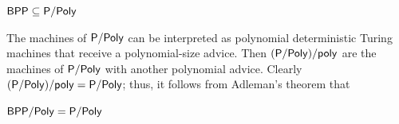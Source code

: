 \begin{theorem}\label{adleman}
    $\mathsf{BPP} \subseteq \mathsf{P/Poly}$
\end{theorem}

The machines of $\mathsf{P/Poly}$ can be interpreted as polynomial deterministic Turing machines that receive a polynomial-size advice.
Then $(\mathsf{P/Poly})/\mathsf{poly}$ are the machines of $\mathsf{P/Poly}$ with another polynomial advice.
Clearly $(\mathsf{P/Poly})/\mathsf{poly} = \mathsf{P/Poly}$; thus, it follows from Adleman's theorem that

\begin{corollary}\label{coro:bpppoly-equals-ppoly}
    $\mathsf{BPP/Poly} = \mathsf{P/Poly}$
\end{corollary}